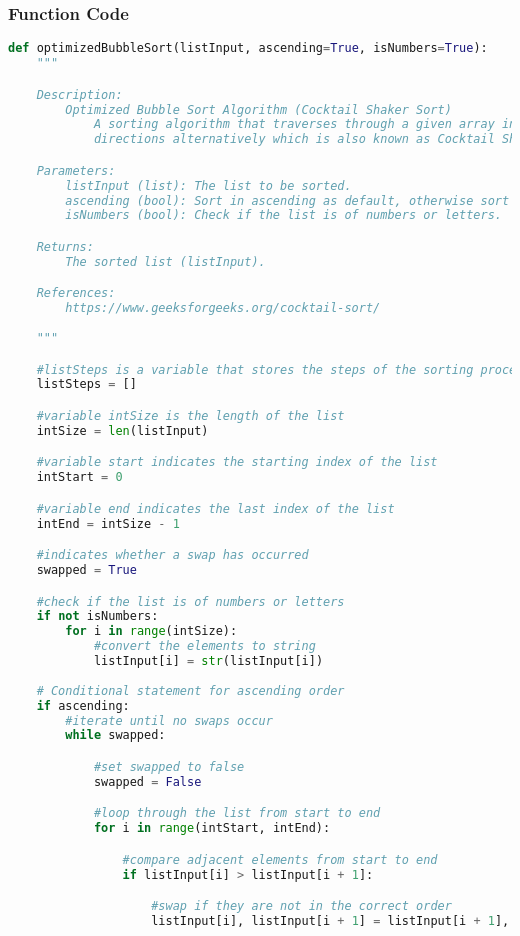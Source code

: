 \documentclass{article}
\begin{document}
\subsubsection*{Function Code}
\begin{lstlisting}[language=Python]
def optimizedBubbleSort(listInput, ascending=True, isNumbers=True):
    """

    Description:
        Optimized Bubble Sort Algorithm (Cocktail Shaker Sort) 
            A sorting algorithm that traverses through a given array in both 
            directions alternatively which is also known as Cocktail Shaker Sort.

    Parameters:
        listInput (list): The list to be sorted.
        ascending (bool): Sort in ascending as default, otherwise sort in descending.
        isNumbers (bool): Check if the list is of numbers or letters.

    Returns: 
        The sorted list (listInput).

    References:
        https://www.geeksforgeeks.org/cocktail-sort/
        
    """ 

    #listSteps is a variable that stores the steps of the sorting process
    listSteps = []

    #variable intSize is the length of the list
    intSize = len(listInput) 

    #variable start indicates the starting index of the list
    intStart = 0 

    #variable end indicates the last index of the list
    intEnd = intSize - 1

    #indicates whether a swap has occurred
    swapped = True 

    #check if the list is of numbers or letters
    if not isNumbers:
        for i in range(intSize):
            #convert the elements to string
            listInput[i] = str(listInput[i])
    
    # Conditional statement for ascending order
    if ascending:
        #iterate until no swaps occur
        while swapped:

            #set swapped to false
            swapped = False

            #loop through the list from start to end
            for i in range(intStart, intEnd):

                #compare adjacent elements from start to end
                if listInput[i] > listInput[i + 1]:

                    #swap if they are not in the correct order
                    listInput[i], listInput[i + 1] = listInput[i + 1], listInput[i]


\end{lstlisting}
\end{document}
